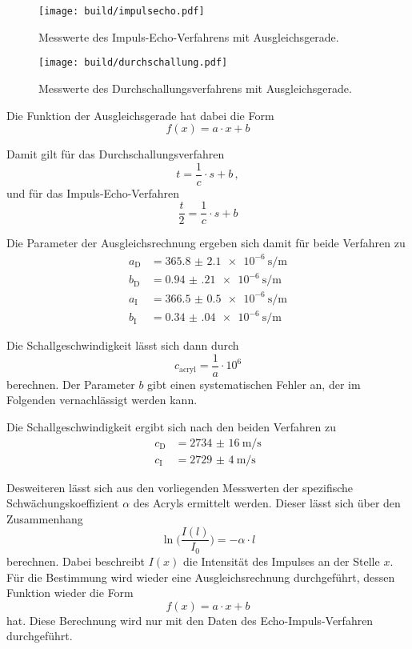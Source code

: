 \begin{figure}
    \centering
    \texttt{[image: build/impulsecho.pdf]}
    \caption{Messwerte des Impuls-Echo-Verfahrens mit Ausgleichsgerade.}
    \label{fig:imp}
\end{figure}

\begin{figure}
    \centering
    \texttt{[image: build/durchschallung.pdf]}
    \caption{Messwerte des Durchschallungsverfahrens mit Ausgleichsgerade.}
    \label{fig:durch}
\end{figure}

Die Funktion der Ausgleichsgerade hat dabei die Form 
\begin{equation}
    f(x) = a\cdot x + b 
\end{equation}

Damit gilt für das Durchschallungsverfahren 
\begin{equation}
    t = \frac{1}{c}\cdot s + b\,,
\end{equation}
und für das Impuls-Echo-Verfahren
\begin{equation}
    \frac{t}{2} = \frac{1}{c}\cdot s + b
\end{equation}

Die Parameter der Ausgleichsrechnung ergeben sich damit für beide Verfahren zu 
\begin{align}
    a_\text{D} &= \SI{365.8(21)e-6}{\s\per\m} \\
    b_\text{D} &= \SI{0.94(21)e-6}{\s\per\m} \\
    a_\text{I} &= \SI{366.5(05)e-6}{\s\per\m} \\
    b_\text{I} &= \SI{0.34(04)e-6}{\s\per\m} 
\end{align}

Die Schallgeschwindigkeit lässt sich dann durch 
\begin{equation}
    c_\text{acryl} = \frac{1}{a}\cdot 10^6
\end{equation}
berechnen. Der Parameter $b$ gibt einen systematischen Fehler an, der im Folgenden vernachlässigt werden kann. 

Die Schallgeschwindigkeit ergibt sich nach den beiden Verfahren zu 
\begin{align}
    c_\text{D} &= \SI{2734(16)}{\m\per\s} \\
    c_\text{I} &= \SI{2729(4)}{\m\per\s}
\end{align}

Desweiteren lässt sich aus den vorliegenden Messwerten der spezifische Schwächungskoeffizient $\alpha$ des Acryls ermittelt 
werden. Dieser lässt sich über den Zusammenhang 
\begin{equation}
    \ln{\bigl(\frac{I(l)}{I_0}\bigr)} = - \alpha \cdot l
\end{equation}
berechnen. Dabei beschreibt $I(x)$ die Intensität des Impulses an der Stelle $x$. Für die Bestimmung wird wieder eine Ausgleichsrechnung
durchgeführt, dessen Funktion wieder die Form 
\begin{equation}
    f(x) = a\cdot x + b 
\end{equation}  
hat. Diese Berechnung wird nur mit den Daten des Echo-Impuls-Verfahren durchgeführt.

